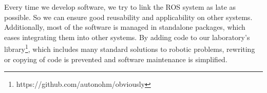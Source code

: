 Every time we develop software, we try to link the ROS system as late as possible. So we can ensure good reusability and applicability on other systems. Additionally, most of the software is managed in standalone packages, which eases integrating them into other systems. By adding code to our laboratory's library\footnote{https://github.com/autonohm/obviously}, which includes many standard solutions to robotic problems, rewriting or copying of code is prevented and software maintenance is simplified.
